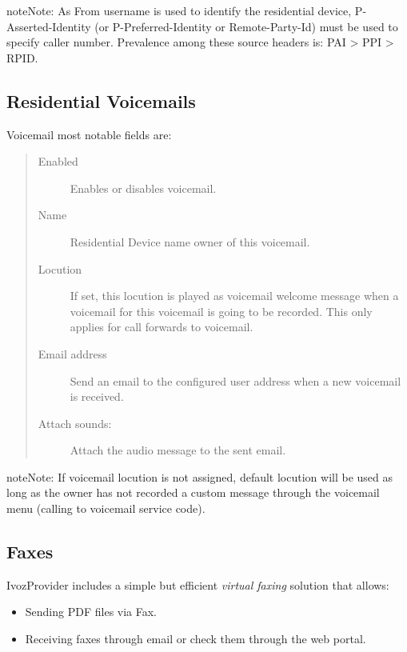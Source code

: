 \documentclass[letterpaper,10pt,english]{sphinxmanual}
\begin{document}
\begin{notice}{note}{Note:}
As From username is used to identify the residential device, P-Asserted-Identity (or P-Preferred-Identity or Remote-Party-Id) must be used to specify caller number.
Prevalence among these source headers is: PAI \textgreater{} PPI \textgreater{} RPID.
\end{notice}


\subsection{Residential Voicemails}
\label{administration_portal/client/residential/residential_voicemails:residential-voicemails}\label{administration_portal/client/residential/residential_voicemails::doc}\label{administration_portal/client/residential/residential_voicemails:id1}
Voicemail most notable fields are:
\begin{quote}
\begin{description}
\item[{Enabled}] \leavevmode
Enables or disables voicemail.

\item[{Name}] \leavevmode
Residential Device name owner of this voicemail.

\item[{Locution}] \leavevmode
If set, this locution is played as voicemail welcome message when a voicemail
for this voicemail is going to be recorded. This only applies for call forwards
to voicemail.

\item[{Email address}] \leavevmode
Send an email to the configured user address when a new voicemail is received.

\item[{Attach sounds:}] \leavevmode
Attach the audio message to the sent email.

\end{description}
\end{quote}

\begin{notice}{note}{Note:}
If voicemail locution is not assigned, default locution will be used as long as
the owner has not recorded a custom message through the voicemail menu (calling to
voicemail service code).
\end{notice}


\subsection{Faxes}
\label{administration_portal/client/residential/faxes:faxes}\label{administration_portal/client/residential/faxes::doc}
IvozProvider includes a simple but efficient \emph{virtual faxing} solution that allows:
\begin{itemize}
\item {} 
Sending PDF files via Fax.

\item {} 
Receiving faxes through email or check them through the web portal.

\end{itemize}
\end{document}
